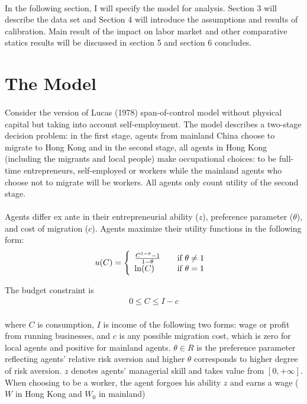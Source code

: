 \documentclass[12pt]{article}
\begin{document}
\paragraph{}
In the following section, I will specify the model for analysis. Section 3 will describe the data set and Section 4 will introduce the assumptions and results of calibration. Main result of the impact on labor market and other comparative statics results will be discussed in section 5 and section 6 concludes.
\pagebreak

\section{The Model}
\paragraph{}
Consider the version of Lucas (1978) span-of-control model without physical capital but taking into account self-employment. The model describes a two-stage decision problem: in the first stage, agents from mainland China choose to migrate to Hong Kong  and in the second stage, all agents in Hong Kong (including the migrants and local people) make occupational choices: to be full-time entrepreneurs, self-employed or workers while the mainland agents who choose not to migrate will be workers. All agents only count utility of the second stage. 

\paragraph{}
Agents differ ex ante in their entrepreneurial ability ($z$), preference parameter ($\theta$), and cost of migration ($c$). Agents maximize their utility functions in the following form:\\
\bigskip
\[ u(C) = \left\{ 
  \begin{array}{l l}
    \frac{C^{1-\theta}-1}{1-\theta} & \quad \text{if $\theta\neq1$ }\\
    \mathrm{ln}(C) & \quad \text{if $\theta=1$ }
  \end{array} \right.\]

\bigskip
The budget constraint is 
\begin{align*} 
0\leq C \leq I-c
\end{align*}
\paragraph{}
where $C$ is consumption, $I$ is income of the following two forms: wage or profit from running businesses, and $c$ is any possible migration cost, which is zero for local agents and positive for mainland agents. $\theta \in R$ is the preference parameter reflecting agents' relative risk aversion and higher $\theta$ corresponds to higher degree of risk aversion. $z$ denotes agents' managerial skill and takes value from $[0,+\infty]$. When choosing to be a worker, the agent forgoes his ability $z$ and earns a wage ($W$ in Hong Kong and $W_0$ in mainland)
\end{document}
